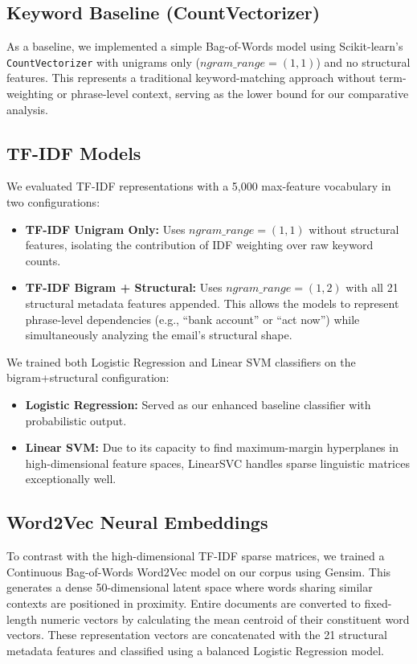 \documentclass[sigconf]{acmart}
\begin{document}
\subsection{Keyword Baseline (CountVectorizer)}
As a baseline, we implemented a simple Bag-of-Words model using Scikit-learn's \texttt{CountVectorizer} with unigrams only (\(ngram\_range=(1,1)\)) and no structural features. This represents a traditional keyword-matching approach without term-weighting or phrase-level context, serving as the lower bound for our comparative analysis.

\subsection{TF-IDF Models}
We evaluated TF-IDF representations with a 5,000 max-feature vocabulary in two configurations:
\begin{itemize}
    \item \textbf{TF-IDF Unigram Only:} Uses \(ngram\_range=(1,1)\) without structural features, isolating the contribution of IDF weighting over raw keyword counts.
    \item \textbf{TF-IDF Bigram + Structural:} Uses \(ngram\_range=(1,2)\) with all 21 structural metadata features appended. This allows the models to represent phrase-level dependencies (e.g., ``bank account'' or ``act now'') while simultaneously analyzing the email's structural shape.
\end{itemize}
We trained both Logistic Regression and Linear SVM classifiers on the bigram+structural configuration:
\begin{itemize}
    \item \textbf{Logistic Regression:} Served as our enhanced baseline classifier with probabilistic output.
    \item \textbf{Linear SVM:} Due to its capacity to find maximum-margin hyperplanes in high-dimensional feature spaces, LinearSVC handles sparse linguistic matrices exceptionally well.
\end{itemize}

\subsection{Word2Vec Neural Embeddings}
To contrast with the high-dimensional TF-IDF sparse matrices, we trained a Continuous Bag-of-Words Word2Vec model on our corpus using Gensim. This generates a dense 50-dimensional latent space where words sharing similar contexts are positioned in proximity. Entire documents are converted to fixed-length numeric vectors by calculating the mean centroid of their constituent word vectors. These representation vectors are concatenated with the 21 structural metadata features and classified using a balanced Logistic Regression model.
\end{document}

